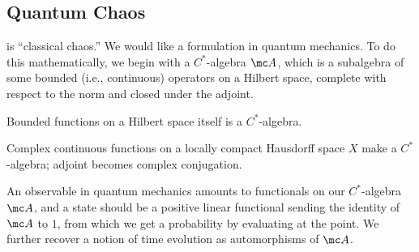\documentclass{article}
\begin{document}
\subsection{Quantum Chaos}
 is ``classical chaos.'' We would like a formulation in quantum mechanics. To do this mathematically, we begin with a $C^*$-algebra $\mc A$, which is a subalgebra of some bounded (i.e., continuous) operators on a Hilbert space, complete with respect to the norm and closed under the adjoint.
\begin{example}
	Bounded functions on a Hilbert space itself is a $C^*$-algebra.
\end{example}
\begin{example}
	Complex continuous functions on a locally compact Hausdorff space $X$ make a $C^*$-alg\-ebra; adjoint becomes complex conjugation.
\end{example}
An observable in quantum mechanics amounts to functionals on our $C^*$-algebra $\mc A$, and a state should be a positive linear functional sending the identity of $\mc A$ to $1$, from which we get a probability by evaluating at the point. We further recover a notion of time evolution as automorphisms of $\mc A$.
\end{document}
